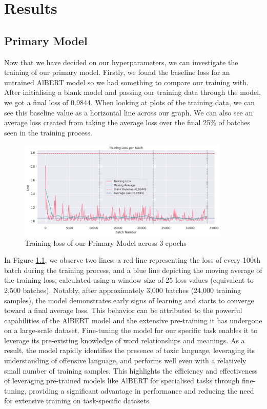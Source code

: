 \chapter{Results}

\section{Primary Model}

Now that we have decided on our hyperparameters, we can investigate the training of our primary model. Firstly, we found the baseline loss for an untrained AlBERT model so we had something to compare our training with. After initialising a blank model and passing our training data through the model, we got a final loss of $0.9844$. When looking at plots of the training data, we can see this baseline value as a horizontal line across our graph. We can also see an average loss created from taking the average loss over the final 25\% of batches seen in the training process.

\begin{figure}[H]
    \centering
    \includegraphics[width=0.9\textwidth]{graphs/training/accumulated_grad_batch/agb-10_training_loss.png}
    \caption{Training loss of our Primary Model across 3 epochs}
    \label{fig:agb_10_train}
\end{figure}

In Figure \ref{fig:agb_10_train}, we observe two lines: a red line representing the loss of every 100th batch during the training process, and a blue line depicting the moving average of the training loss, calculated using a window size of 25 loss values (equivalent to 2,500 batches). Notably, after approximately 3,000 batches (24,000 training samples), the model demonstrates early signs of learning and starts to converge toward a final average loss. This behavior can be attributed to the powerful capabilities of the AlBERT model and the extensive pre-training it has undergone on a large-scale dataset. Fine-tuning the model for our specific task enables it to leverage its pre-existing knowledge of word relationships and meanings. As a result, the model rapidly identifies the presence of toxic language, leveraging its understanding of offensive language, and performs well even with a relatively small number of training samples. This highlights the efficiency and effectiveness of leveraging pre-trained models like AlBERT for specialised tasks through fine-tuning, providing a significant advantage in performance and reducing the need for extensive training on task-specific datasets.


